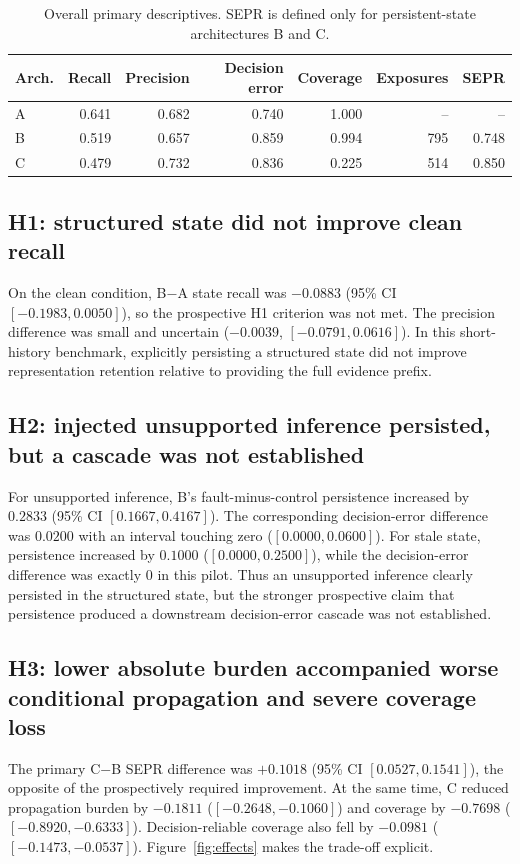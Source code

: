 \documentclass[10pt]{article}
\begin{document}
\begin{table}[t]
\centering
\caption{Overall primary descriptives. SEPR is defined only for persistent-state architectures B and C.}
\label{tab:overall}
\begin{tabular}{lrrrrrr}
\toprule
Arch. & Recall & Precision & Decision error & Coverage & Exposures & SEPR \\
\midrule
A & 0.641 & 0.682 & 0.740 & 1.000 & -- & -- \\
B & 0.519 & 0.657 & 0.859 & 0.994 & 795 & 0.748 \\
C & 0.479 & 0.732 & 0.836 & 0.225 & 514 & 0.850 \\
\bottomrule
\end{tabular}
\end{table}

\subsection{H1: structured state did not improve clean recall}
On the clean condition, B$-$A state recall was $-0.0883$ (95\% CI $[-0.1983,0.0050]$), so the prospective H1 criterion was not met. The precision difference was small and uncertain ($-0.0039$, $[-0.0791,0.0616]$). In this short-history benchmark, explicitly persisting a structured state did not improve representation retention relative to providing the full evidence prefix.

\subsection{H2: injected unsupported inference persisted, but a cascade was not established}
For unsupported inference, B's fault-minus-control persistence increased by $0.2833$ (95\% CI $[0.1667,0.4167]$). The corresponding decision-error difference was $0.0200$ with an interval touching zero ($[0.0000,0.0600]$). For stale state, persistence increased by $0.1000$ ($[0.0000,0.2500]$), while the decision-error difference was exactly 0 in this pilot. Thus an unsupported inference clearly persisted in the structured state, but the stronger prospective claim that persistence produced a downstream decision-error cascade was not established.

\subsection{H3: lower absolute burden accompanied worse conditional propagation and severe coverage loss}
The primary C$-$B SEPR difference was $+0.1018$ (95\% CI $[0.0527,0.1541]$), the opposite of the prospectively required improvement. At the same time, C reduced propagation burden by $-0.1811$ ($[-0.2648,-0.1060]$) and coverage by $-0.7698$ ($[-0.8920,-0.6333]$). Decision-reliable coverage also fell by $-0.0981$ ($[-0.1473,-0.0537]$). Figure~\ref{fig:effects} makes the trade-off explicit.
\end{document}
